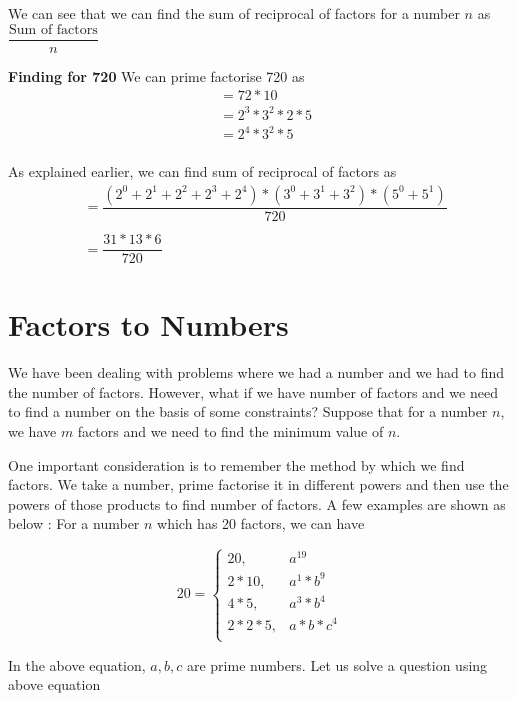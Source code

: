 \begin{EXTRA-LEARNING}
    We can see that we can find the sum of reciprocal of factors for a number $n$ as $\dfrac{\text{Sum of factors}}{n}$
\end{EXTRA-LEARNING}

\textbf{Finding for 720}
We can prime factorise 720 as 
\begin{align*}
    &= 72 * 10 \\
    &= 2^3 * 3^2 * 2 * 5 \\
    &= 2^4 * 3^2 * 5 \\
\end{align*}

As explained earlier, we can find sum of reciprocal of factors as 
\begin{align*}
    &= \dfrac{(2^0 + 2^1 + 2^2 + 2^3 + 2^4) * (3^0 + 3^1 + 3^2) * (5^0 + 5^1)}{720} \\ \\
    &= \dfrac{31 * 13 * 6}{720}
\end{align*}

\section{Factors to Numbers}
We have been dealing with problems where we had a number and we had to find the number of factors. However, what if we have number of factors and we need to find a number on the basis of some constraints? Suppose that for a number $n$, we have $m$ factors and we need to find the minimum value of $n$. 

One important consideration is to remember the method by which we find factors. We take a number, prime factorise it in different powers and then use the powers of those products to find number of factors. A few examples are shown as below : For a number $n$ which has 20 factors, we can have 

\begin{equation*}
    20 =
    \begin{cases}
        20, & a^{19} \\
        2 * 10, & a^1 * b^9 \\
        4 * 5, & a^3 * b^4 \\
        2 * 2 * 5, & a * b * c^4 \\ 
    \end{cases}
\end{equation*}

In the above equation, $a,b,c$ are prime numbers. Let us solve a question using above equation

